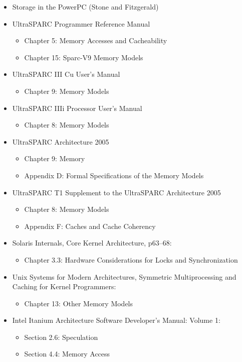 \begin{itemize}
\item
Storage in the PowerPC (Stone and Fitzgerald)

\item
UltraSPARC Programmer Reference Manual
  \begin{itemize}
    \item
	Chapter 5: Memory Accesses and Cacheability
    \item
	Chapter 15: Sparc-V9 Memory Models
  \end{itemize}

\item
UltraSPARC III Cu User's Manual
  \begin{itemize}
    \item
	Chapter 9: Memory Models
  \end{itemize}

\item
UltraSPARC IIIi Processor User's Manual
  \begin{itemize}
    \item
	Chapter 8: Memory Models
  \end{itemize}

\item
UltraSPARC Architecture 2005
  \begin{itemize}
    \item
	Chapter 9: Memory
    \item
	Appendix D: Formal Specifications of the Memory Models
  \end{itemize}

\item
UltraSPARC T1 Supplement to the UltraSPARC Architecture 2005
  \begin{itemize}
    \item
	Chapter 8: Memory Models
    \item
	Appendix F: Caches and Cache Coherency
  \end{itemize}

\item
Solaris Internals, Core Kernel Architecture, p63--68:
  \begin{itemize}
    \item
	Chapter 3.3: Hardware Considerations for Locks and
			Synchronization
  \end{itemize}

\item
Unix Systems for Modern Architectures, Symmetric Multiprocessing and Caching
for Kernel Programmers:
  \begin{itemize}
    \item
	Chapter 13: Other Memory Models
  \end{itemize}

\item
Intel Itanium Architecture Software Developer's Manual: Volume 1:
  \begin{itemize}
    \item
	Section 2.6: Speculation
    \item
	Section 4.4: Memory Access
  \end{itemize}
\end{itemize}
